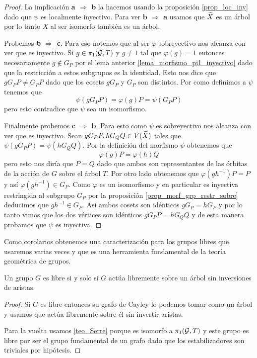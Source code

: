\documentclass[tesis.tex]{subfiles}
\begin{document}
\begin{proof}	
		 La implicación \textbf{a $\Rightarrow$ b} la hacemos usando la proposición \ref{prop_loc_iny} dado que $\psi$ es localmente inyectivo.
		 Para ver \textbf{b $\Rightarrow$ a} usamos que $\widetilde X$ es un árbol por lo tanto $X$ al ser isomorfo también es un árbol.
		 
		 Probemos \textbf{b $\Rightarrow$ c}. 
		 Para eso notemos que al ser $\varphi$ sobreyectivo nos alcanza con ver que es inyectivo.
		 Si $g \in \pi_1({\cal G}, T)$ y $g \neq 1$ tal que $\varphi(g)= 1$ entonces necesariamente $g \notin G_P$ por el lema anterior \ref{lema_morfismo_pi1_inyectivo} dado que la restricción a estos subgrupos es la identidad.
		 Esto nos dice que $g G_P P \neq G_P P$ dado que los cosets $gG_P$ y $G_P$ son distintos. Por como definimos a $\psi$ tenemos que 
		 \[
		 \psi (gG_P P) = \varphi(g) P  = \psi(G_P P)
		 \] 
		 pero esto contradice que $\psi$ sea un isomorfismo.
		 
		 Finalmente probemos \textbf{c $\Rightarrow$ b}. 
		 Para esto como $\psi$ es sobreyectivo nos alcanza con ver que es inyectivo.
		 Sean $gG_PP, hG_QQ \in V(\widetilde X)$ tales que $\psi(gG_PP) = \psi(hG_QQ)$.
		 Por la definición del morfismo $\psi$ obtenemos que 
		 \[
		 	\varphi(g)P = \varphi(h)Q
		 \]
		 pero esto nos diría que $P = Q$ dado que ambos son representantes de las órbitas de la acción de $G$ sobre el árbol $T$. 
		 Por otro lado obtenemos que $\varphi(g h^{-1}) P  =  P$ y así $\varphi(gh^{-1}) \in G_P$. 
		 Como $\varphi$ es un isomorfismo y en particular es inyectiva restringida al subgrupo $G_P$ por la proposición \ref{prop_morf_grp_restr_sobre} deducimos que $gh^{-1} \in G_P$.
		 Así ambos cosets son idénticos $g G_P = h G_P$ y por lo tanto vimos que los dos vértices son idénticos $gG_PP  = hG_QQ$ y de esta manera probamos que $\psi$ es inyectiva.
\end{proof}

Como corolarios obtenemos una caracterización para los grupos libres que usaremos varias veces y que es una herramienta fundamental de la teoría geométrica de grupos.

\begin{coro}\label{coro_libre_sii_actua_arbol}
	Un grupo $G$ es libre si y solo sí $G$ actúa libremente sobre un árbol sin inversiones de aristas. 
\end{coro}
\begin{proof}
	Si $G$ es libre entonces su grafo de Cayley lo podemos tomar como un árbol y usamos que actúa libremente sobre él sin invertir aristas.
	
	Para la vuelta usamos \ref{teo_Serre} porque es isomorfo a $\pi_1({\cal G}, T)$ y este grupo es libre por ser el grupo fundamental de un grafo dado que los estabilizadores son triviales por hipótesis.
\end{proof}
\end{document}
